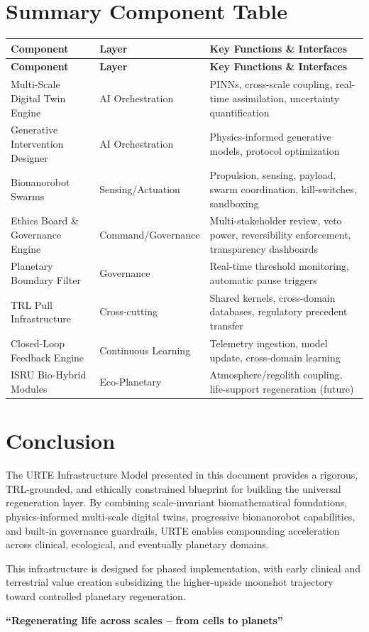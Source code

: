 \documentclass[11pt,a4paper]{report}
\begin{document}
\chapter{Summary Component Table}

\begin{center}
\begin{longtable}{p{4.5cm}p{3cm}p{7cm}}
\toprule
\textbf{Component} & \textbf{Layer} & \textbf{Key Functions \& Interfaces} \\
\midrule
\endfirsthead
\toprule
\textbf{Component} & \textbf{Layer} & \textbf{Key Functions \& Interfaces} \\
\midrule
\endhead
\bottomrule
\endfoot
Multi-Scale Digital Twin Engine & AI Orchestration & PINNs, cross-scale coupling, real-time assimilation, uncertainty quantification \\
Generative Intervention Designer & AI Orchestration & Physics-informed generative models, protocol optimization \\
Bionanorobot Swarms & Sensing/Actuation & Propulsion, sensing, payload, swarm coordination, kill-switches, sandboxing \\
Ethics Board \& Governance Engine & Command/Governance & Multi-stakeholder review, veto power, reversibility enforcement, transparency dashboards \\
Planetary Boundary Filter & Governance & Real-time threshold monitoring, automatic pause triggers \\
TRL Pull Infrastructure & Cross-cutting & Shared kernels, cross-domain databases, regulatory precedent transfer \\
Closed-Loop Feedback Engine & Continuous Learning & Telemetry ingestion, model update, cross-domain learning \\
ISRU Bio-Hybrid Modules & Eco-Planetary & Atmosphere/regolith coupling, life-support regeneration (future) \\
\end{longtable}
\end{center}

\chapter{Conclusion}

The URTE Infrastructure Model presented in this document provides a rigorous, TRL-grounded, and ethically constrained blueprint for building the universal regeneration layer. By combining scale-invariant biomathematical foundations, physics-informed multi-scale digital twins, progressive bionanorobot capabilities, and built-in governance guardrails, URTE enables compounding acceleration across clinical, ecological, and eventually planetary domains.

This infrastructure is designed for phased implementation, with early clinical and terrestrial value creation subsidizing the higher-upside moonshot trajectory toward controlled planetary regeneration.

\vspace{1cm}
\begin{center}
\textbf{``Regenerating life across scales -- from cells to planets''}
\end{center}
\end{document}
